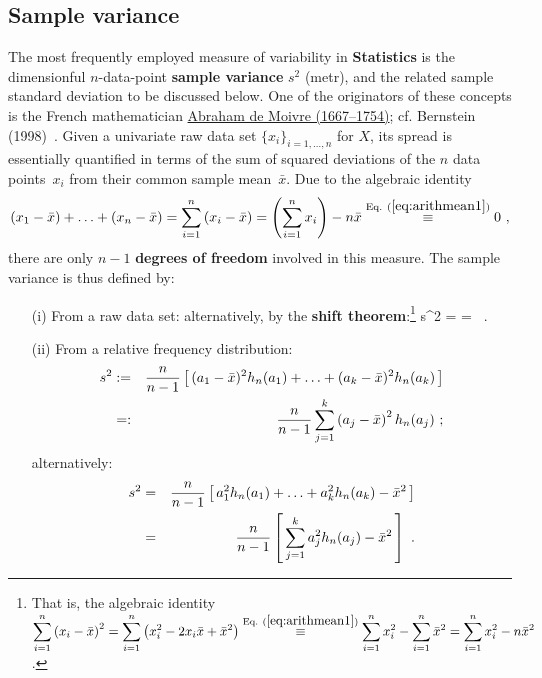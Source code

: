 \subsection[Sample variance]{Sample variance}
The most frequently employed measure of variability in \textbf{
Statistics} is the dimensionful $n$-data-point \textbf{sample 
variance} $s^{2}$ (metr), and the related sample standard 
deviation to be discussed below. One of the originators of these 
concepts is the French mathematician 
\href{http://www-history.mcs.st-and.ac.uk/Biographies/De_Moivre.html}{Abraham de Moivre (1667--1754)}; cf. Bernstein (1998)~.
Given a univariate raw data set  
$\{x_{i}\}_{i=1,\ldots,n}$ for $X$, its spread is essentially 
quantified in terms of the sum of squared deviations of the $n$ 
data points~$x_{i}$ from their common sample mean~$\bar{x}$. Due 
to the algebraic identity
%
\[
\left(x_{1}-\bar{x}\right) + \ldots + \left(x_{n}-\bar{x}\right)
= \sum_{i=1}^{n}\left(x_{i}-\bar{x}\right)
= \left(\sum_{i=1}^{n}x_{i}\right) - n\bar{x}
\stackrel{\text{Eq.}~(\ref{eq:arithmean1})}{\equiv} 0 \ ,
\]
%
there are only $n-1$ \textbf{degrees of freedom} involved in this 
measure. The sample variance is thus defined by:
%
\begin{itemize}
\item[(i)] From a raw data set:
%
\be
{}
\ee
%
alternatively, by the \textbf{shift theorem}:\footnote{That is,
the algebraic identity 
$\displaystyle\sum_{i=1}^{n}\left(x_{i}-\bar{x}\right)^{2}
= \sum_{i=1}^{n}\left(x_{i}^{2}-2x_{i}\bar{x}+\bar{x}^{2}\right)
\stackrel{\text{Eq.}~(\ref{eq:arithmean1})}{\equiv} 
\sum_{i=1}^{n}x_{i}^{2}-\sum_{i=1}^{n}\bar{x}^{2}
= \sum_{i=1}^{n}x_{i}^{2}-n\bar{x}^{2}$.}
%
\be
{}
s^{2}
= 
= \left[\,\sum_{i=1}^{n}x_{i}^{2}-n\bar{x}{}^{2}
\,\right] \ .
\ee
%
\item[(ii)] From a relative frequency distribution:
%
\begin{eqnarray}
\lb{eq:ssqurel1}
s^{2}
& := & \frac{n}{n-1}\left[\,(a_{1}-\bar{x})^{2}h_{n}(a_{1})+\ldots
+(a_{k}-\bar{x})^{2}h_{n}(a_{k})\,\right] \nonumber\\
& =: & \frac{n}{n-1}\sum_{j=1}^{k}\left(a_{j}-\bar{x}\right)^{2}
h_{n}(a_{j}) \ ;
\end{eqnarray}
%
alternatively:
%
\begin{eqnarray}
\lb{eq:ssqurel2}
s^{2}
& = & \frac{n}{n-1}\left[\,a_{1}^{2}h_{n}(a_{1})+\ldots
+a_{k}^{2}h_{n}(a_{k})-\bar{x}{}^{2}\,\right] \nonumber\\
& = & \frac{n}{n-1}\left[\,\sum_{j=1}^{k}a_{j}^{2}h_{n}(a_{j})
-\bar{x}{}^{2}\,\right] \ .
\end{eqnarray}
%

\end{itemize}
